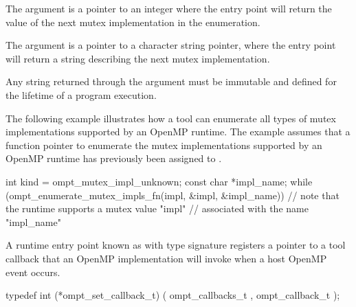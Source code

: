 The argument  is a pointer to an integer where
the entry point will return the value of the next mutex implementation
in the enumeration.

The argument  is a pointer to a character
string pointer, where the entry point will return a string describing
the next mutex implementation.

\constraints
Any string returned through the argument
 must be immutable and defined
for the lifetime of a program execution.

\begin{note}
The following example illustrates how a tool can
enumerate all types of mutex implementations supported by an OpenMP runtime.
The example assumes that a function pointer to enumerate
the mutex implementations supported by an OpenMP runtime
has previously been assigned to .
\vspace{2ex}


\begin{ccppspecific}
\begin{omptOther}
int kind = ompt_mutex_impl_unknown;
const char *impl_name;
while (ompt_enumerate_mutex_impls_fn(impl, &impl, &impl_name)) {
  // note that the runtime supports a mutex value "impl"
  // associated with the name "impl_name"
}
\end{omptOther}
\end{ccppspecific}

\end{note}


\label{sec:ompt_set_callback_t}
\label{sec:ompt_set_callback}

\summary

A runtime entry point known as 
with type signature  registers a
pointer to a tool callback that an OpenMP implementation will invoke when a host
OpenMP event occurs.

\format

\begin{ccppspecific}
\begin{omptCallback}
typedef int (*ompt_set_callback_t) (
  ompt_callbacks_t ,
  ompt_callback_t 
);
\end{omptCallback}
\end{ccppspecific}


\descr

